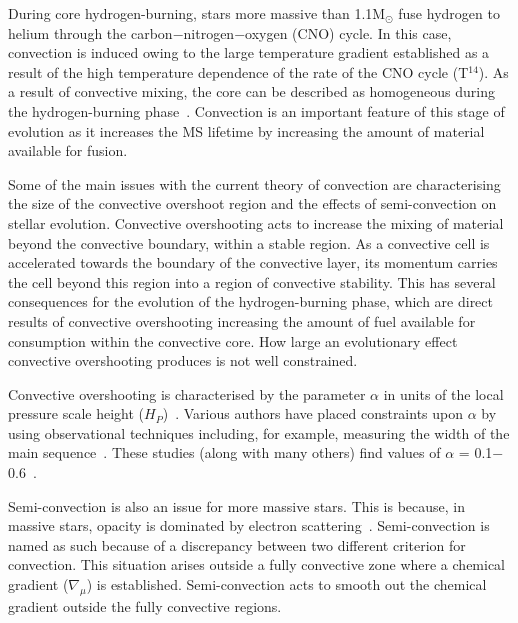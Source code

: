 \documentclass[a4paper,12pt]{article}
\begin{document}
During core hydrogen-burning, stars more massive than 1.1M$_{\odot}$ fuse hydrogen to helium through the carbon$-$nitrogen$-$oxygen (CNO) cycle.
In this case, convection is induced owing to the large temperature gradient established as a result of the high temperature dependence of the rate of the CNO cycle (T$^{14}$).
As a result of convective mixing, the core can be described as homogeneous during the hydrogen-burning phase~\citep{b:KippenhahnWeigert}.
Convection is an important feature of this stage of evolution as it increases the MS lifetime by increasing the amount of material available for fusion. 

Some of the main issues with the current theory of convection are characterising the size of the convective overshoot region and the effects of semi-convection on stellar evolution.
Convective overshooting acts to increase the mixing of material beyond the convective boundary, within a stable region.
As a convective cell is accelerated towards the boundary of the convective layer, its momentum carries the cell beyond this region into a region of convective stability.
This has several consequences for the evolution of the hydrogen-burning phase, which are direct results of convective overshooting increasing the amount of fuel available for consumption within the convective core. 
How large an evolutionary effect convective overshooting produces is not well constrained.

Convective overshooting is characterised by the parameter $\alpha$ in units of the local pressure scale height ($H_{P}$)~\citep{b:KippenhahnWeigert}. 
Various authors have placed constraints upon $\alpha$ by using observational techniques including, for example, measuring the width of the main sequence~\citep{Schroder97,Brott11}.
These studies (along with many others) find values of $\alpha$ = 0.1$-$0.6~\citep[a recent example is][finding $\alpha = 0.335$]{Brott11}.

Semi-convection is also an issue for more massive stars.
This is because, in massive stars, opacity is dominated by electron scattering~\citep{b:Bohm-vitense92.v3}.
Semi-convection is named as such because of a discrepancy between two different criterion for convection.
This situation arises outside a fully convective zone where a chemical gradient ($\nabla _{\mu}$) is established. 
Semi-convection acts to smooth out the chemical gradient outside the fully convective regions. 
\end{document}
